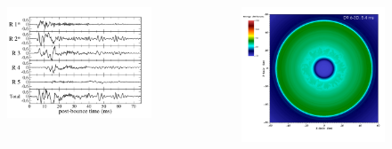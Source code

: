 \documentclass[aspectratio=169]{beamer}
\begin{document}
\begin{frame}

  \begin{columns}[c]

      \begin{figure}
        \includegraphics[width=1.0\textwidth]{Figures/D9.6_strain_byRegions.pdf}
      \end{figure}

      \begin{figure}
        \includegraphics[width=1.0\textwidth]{Figures/D9.6_entropy_5.4ms.png}
      \end{figure}

  \end{columns}

\end{frame}
\end{document}
